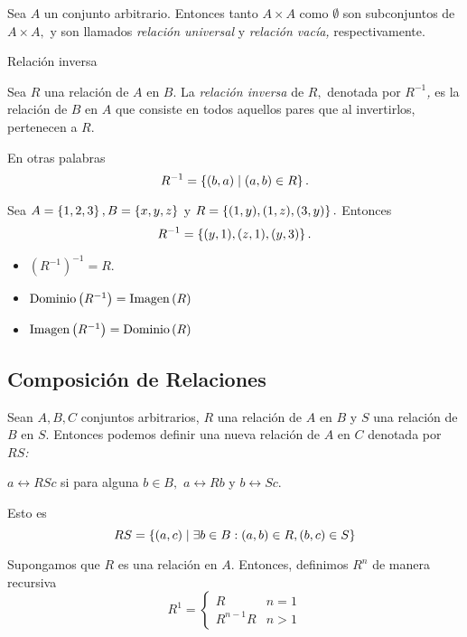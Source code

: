 	Sea $A$ un conjunto arbitrario. Entonces tanto $A\times A$ como $\emptyset$ son subconjuntos de $A \times A,$ y son llamados \emph{relación universal} y \emph{relación vacía,} respectivamente.



	{Relación inversa}
	
	Sea $R$ una relación de $A$ en $B.$ La \emph{relación inversa} de $R,$ denotada por \emph{$R^{-1}$,} es la relación de $B$ en $A$ que consiste en todos aquellos pares que al invertirlos, pertenecen a $R.$ 
	
	En otras palabras
	$$
	R^{-1}=\left\{ (b,a)\mid (a,b)\in R \right\}.
	$$



	\begin{problema}
		Sea $A=\left\{ 1,2,3 \right\}, B=\left\{ x,y,z \right\}$ y $R=\left\{ (1,y),(1,z),(3,y) \right\}.$ Entonces
		$$
		R^{-1}=\left\{ (y,1), (z,1), (y,3) \right\}.
		$$
	\end{problema}



	\begin{observacion}
		\begin{itemize}
			\item $\left( R^{-1} \right)^{-1}=R.$
			\item $\operatorname{Dominio}\left( R^{-1} \right)=\operatorname{Imagen}\left( R \right)$
			\item $\operatorname{Imagen}\left( R^{-1} \right)=\operatorname{Dominio}\left( R \right)$
		\end{itemize}
	\end{observacion}




\subsection{Composición de Relaciones}

	Sean $A,B,C$ conjuntos arbitrarios, $R$ una relación de $A$ en $B$ y $S$ una relación de $B$ en $S.$  Entonces podemos definir una nueva relación de $A$ en $C$ denotada por \emph{$RS$:}
	\begin{center}
		$a\rel{{RS}}c$ si para alguna $b \in B,$ $a\rel{R}b$ y $b\rel{S}c.$
	\end{center} 



	Esto es
	$$
	RS=\left\{ (a,c)\mid \exists b\in B: (a,b)\in R, (b,c)\in S \right\}
	$$



	Supongamos que $R$ es una relación en $A.$ Entonces, definimos $R^{n}$ de manera recursiva
	$$
	R^{1}=
	\begin{cases}
		R & n=1 \\
		R^{n-1}R & n>1
	\end{cases}
	$$




